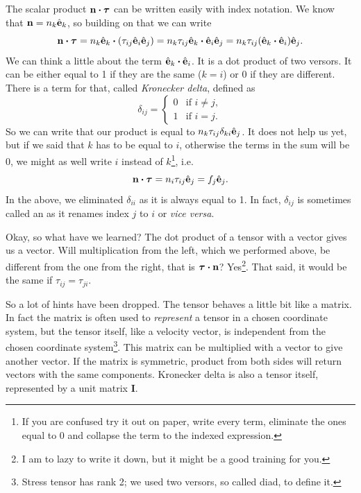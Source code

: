 \documentclass[a4paper]{article}
\begin{document}
The scalar product \(\vb{n}\dotproduct\bm{\tau}\) can be written easily
with index notation. We know that \(\vb{n} = n_k \hat{\vb{e}}_k\), so
building on that we can write
\[
	\vb{n}\dotproduct\bm{\tau}
	= n_k \hat{\vb{e}}_k \dotproduct \qty(\tau_{ij}\hat{\vb{e}}_i \hat{\vb{e}}_j)
	= n_k \tau_{ij} \hat{\vb{e}}_k \dotproduct \hat{\vb{e}}_i \hat{\vb{e}}_j
	= n_k \tau_{ij} \qty(\hat{\vb{e}}_k \dotproduct \hat{\vb{e}}_i) \hat{\vb{e}}_j.
\]
We can think a little about the term \(\hat{\vb{e}}_k \dotproduct \hat{\vb{e}}_i\).
It is a dot product of two versors. It can be either equal to 1 if they are
the same (\(k=i\)) or 0 if they are different. There is a term for that, called
\emph{Kronecker delta}, defined as
\[
	\delta_{ij} = \begin{cases}
		0 & \text{if } i \neq j, \\
		1 & \text{if } i=j.\end{cases}
\]
So we can write that our product is equal to
\(n_k \tau_{ij}\delta_{ki} \hat{\vb{e}}_j \). It does not help us yet, but if
we said that \(k\) has to be equal to \(i\), otherwise the terms in the sum
will be 0, we might as well write \(i\) instead of \(k\)\footnote{If you are
	confused try it out on paper, write every term, eliminate the ones equal to 0
	and collapse the term to the indexed expression.}, i.e.\
\[
	\vb{n}\dotproduct\bm{\tau} = n_i \tau_{ij} \hat{\vb{e}}_j = f_j \hat{\vb{e}}_j.
\]
In the above, we eliminated \(\delta_{ii}\) as it is always equal to 1. In fact,
\(\delta_{ij}\) is sometimes called an \say{index renamer} as it renames index
\(j\) to \(i\) or \textit{vice versa}.

Okay, so what have we learned? The dot product of a tensor with a vector gives
us a vector. Will multiplication from the left, which we performed above, be
different from the one from the right, that is \(\bm{\tau}\dotproduct\vb{n}\)?
Yes\footnote{I am to lazy to write it down, but it might be a good training
	for you.}. That said, it would be the same if \(\tau_{ij} = \tau_{ji}\).

So a lot of hints have been dropped. The tensor behaves a little bit like a
matrix. In fact the matrix is often used to \emph{represent} a tensor in a
chosen coordinate system, but the tensor itself, like a velocity vector, is
independent from the chosen coordinate system\footnote{Stress tensor has rank 2; we
	used two versors, so called diad, to define it.}. This matrix can be multiplied with a vector to give
another vector. If the matrix is symmetric, product from both sides will return vectors
with the same components. Kronecker delta is also a tensor itself, represented by
a unit matrix \(\bm{I}\).
\end{document}
